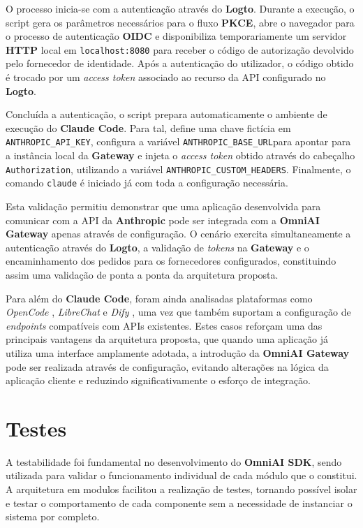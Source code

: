     O processo inicia-se com a autenticação através do \textbf{Logto}. Durante a execução, o script gera os parâmetros necessários para o fluxo \textbf{PKCE}, abre o navegador para o processo de autenticação \textbf{OIDC} e disponibiliza temporariamente um servidor \textbf{HTTP} local em \texttt{localhost:8080} para receber o código de autorização devolvido pelo fornecedor de identidade. Após a autenticação do utilizador, o código obtido é trocado por um \textit{access token} associado ao recurso da API configurado no \textbf{Logto}.

    Concluída a autenticação, o script prepara automaticamente o ambiente de execução do \textbf{Claude Code}. Para tal, define uma chave fictícia em \texttt{ANTHROPIC\_API\_KEY}, configura a variável \texttt{ANTHROPIC\_\allowbreak BASE\_\allowbreak URL}para apontar para a instância local da \textbf{Gateway} e injeta o \textit{access token} obtido através do cabeçalho \texttt{Authorization}, utilizando a variável \texttt{ANTHROPIC\_CUSTOM\_HEADERS}. Finalmente, o comando \texttt{claude} é iniciado já com toda a configuração necessária.

    Esta validação permitiu demonstrar que uma aplicação desenvolvida para comunicar com a API da \textbf{Anthropic} pode ser integrada com a \textbf{OmniAI Gateway} apenas através de configuração. O cenário exercita simultaneamente a autenticação através do \textbf{Logto}, a validação de \textit{tokens} na \textbf{Gateway} e o encaminhamento dos pedidos para os fornecedores configurados, constituindo assim uma validação de ponta a ponta da arquitetura proposta.

    Para além do \textbf{Claude Code}, foram ainda analisadas plataformas como \textit{OpenCode} \cite{opencode_ref}, \textit{LibreChat} \cite{librechat_ref} e \textit{Dify} \cite{dify_ref}, uma vez que também suportam a configuração de \textit{endpoints} compatíveis com APIs existentes. Estes casos reforçam uma das principais vantagens da arquitetura proposta, que quando uma aplicação já utiliza uma interface amplamente adotada, a introdução da \textbf{OmniAI Gateway} pode ser realizada através de configuração, evitando alterações na lógica da aplicação cliente e reduzindo significativamente o esforço de integração.

    \section{Testes}

    A testabilidade foi fundamental no desenvolvimento do \textbf{OmniAI SDK}, sendo utilizada para validar o funcionamento individual de cada módulo que o constitui. A arquitetura em modulos facilitou a realização de testes, tornando possível isolar e testar o comportamento de cada componente sem a necessidade de instanciar o sistema por completo.

